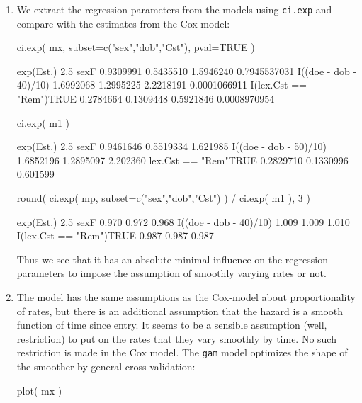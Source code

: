 \begin{enumerate}[resume]
\item We extract the regression parameters from the models using
  \texttt{ci.exp} and compare with the estimates from the Cox-model:
\begin{Schunk}
\begin{Sinput}
 ci.exp( mx, subset=c("sex","dob","Cst"), pval=TRUE )
\end{Sinput}
\begin{Soutput}
                        exp(Est.)      2.5%     97.5%            P
sexF                    0.9309991 0.5435510 1.5946240 0.7945537031
I((doe - dob - 40)/10)  1.6992068 1.2995225 2.2218191 0.0001066911
I(lex.Cst == "Rem")TRUE 0.2784664 0.1309448 0.5921846 0.0008970954
\end{Soutput}
\begin{Sinput}
 ci.exp( m1 )
\end{Sinput}
\begin{Soutput}
                       exp(Est.)      2.5%    97.5%
sexF                   0.9461646 0.5519334 1.621985
I((doe - dob - 50)/10) 1.6852196 1.2895097 2.202360
lex.Cst == "Rem"TRUE   0.2829710 0.1330996 0.601599
\end{Soutput}
\begin{Sinput}
 round( ci.exp( mp, subset=c("sex","dob","Cst") ) / ci.exp( m1 ), 3 )
\end{Sinput}
\begin{Soutput}
                        exp(Est.)  2.5% 97.5%
sexF                        0.970 0.972 0.968
I((doe - dob - 40)/10)      1.009 1.009 1.010
I(lex.Cst == "Rem")TRUE     0.987 0.987 0.987
\end{Soutput}
\end{Schunk}
Thus we see that it has an absolute minimal influence on the
regression parameters to impose the assumption of smoothly varying
rates or not.

  
\item The model has the same assumptions as the Cox-model about
  proportionality of rates, but there is an additional assumption that
  the hazard is a smooth function of time since entry. It seems to be
  a sensible assumption (well, restriction) to put on the rates that
  they vary smoothly by time. No such restriction is made in the Cox
  model. The \texttt{gam} model optimizes the shape of the smoother by
  general cross-validation:
\begin{Schunk}
\begin{Sinput}
 plot( mx )
\end{Sinput}
\end{Schunk}


\end{enumerate}
